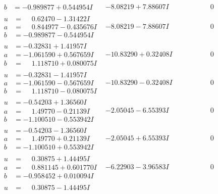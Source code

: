 \documentclass[1p]{elsarticle_modified}
\theoremstyle{definition}
\begin{document}
$$\begin{array}{c|c|c}
\begin{aligned}
b &= -0.989877 + 0.544954 I\end{aligned}
 & -8.08219 + 7.88607 I & \phantom{-0.000000 } 0 \\ \hline\begin{aligned}
u &= \phantom{-}0.62470 - 1.31422 I \\
a &= \phantom{-}0.844977 - 0.435676 I \\
b &= -0.989877 - 0.544954 I\end{aligned}
 & -8.08219 - 7.88607 I & \phantom{-0.000000 } 0 \\ \hline\begin{aligned}
u &= -0.32831 + 1.41957 I \\
a &= -1.061590 + 0.567659 I \\
b &= \phantom{-}1.118710 + 0.080075 I\end{aligned}
 & -10.83290 + 0.32408 I & \phantom{-0.000000 } 0 \\ \hline\begin{aligned}
u &= -0.32831 - 1.41957 I \\
a &= -1.061590 - 0.567659 I \\
b &= \phantom{-}1.118710 - 0.080075 I\end{aligned}
 & -10.83290 - 0.32408 I & \phantom{-0.000000 } 0 \\ \hline\begin{aligned}
u &= -0.54203 + 1.36560 I \\
a &= \phantom{-}1.49770 - 0.21139 I \\
b &= -1.100510 - 0.553942 I\end{aligned}
 & -2.05045 - 6.55393 I & \phantom{-0.000000 } 0 \\ \hline\begin{aligned}
u &= -0.54203 - 1.36560 I \\
a &= \phantom{-}1.49770 + 0.21139 I \\
b &= -1.100510 + 0.553942 I\end{aligned}
 & -2.05045 + 6.55393 I & \phantom{-0.000000 } 0 \\ \hline\begin{aligned}
u &= \phantom{-}0.30875 + 1.44495 I \\
a &= \phantom{-}0.881145 + 0.601770 I \\
b &= -0.958452 + 0.010094 I\end{aligned}
 & -6.22903 - 3.96583 I & \phantom{-0.000000 } 0 \\ \hline\begin{aligned}
u &= \phantom{-}0.30875 - 1.44495 I \\

\end{aligned}
\end{array}$$
\end{document}
